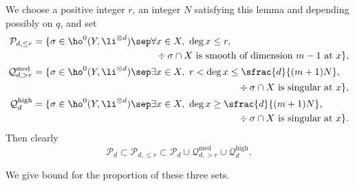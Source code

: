 We choose a positive integer $r$, an integer $N$ satisfying this lemma and depending possibly on $q$, and set
\begin{align*}
\mathcal{P}_{d,\leq r}&=\{ \sigma\in \ho^0(Y,\li^{\otimes d})\sep \forall x\in X,\ \deg x\leq r,\\
&\hspace*{4.5cm} \div \sigma\cap X \text{ is smooth of dimension } m-1 \text{ at }x \}, \\
\mathcal{Q}_{d, >r}^{\mathrm{med}} &= \{ \sigma\in \ho^0(Y,\li^{\otimes d})\sep \exists x\in X,\ r<\deg x\leq \sfrac{d}{(m+1)N},\\ &\hspace*{7.5cm}\div \sigma\cap X \text{ is singular at }x \}, \\
\mathcal{Q}_{d}^{\mathrm{high}}&= \{ \sigma\in \ho^0(Y,\li^{\otimes d})\sep \exists x\in X,\ \deg x\geq \sfrac{d}{(m+1)N},\\
&\hspace*{7.5cm}\div \sigma\cap X \text{ is singular at }x \}.
\end{align*}
Then clearly
\[
\mathcal{P}_{d}\subset\mathcal{P}_{d,\leq r}\subset \mathcal{P}_{d}\cup \mathcal{Q}_{d, >r}^{\mathrm{med}}\cup \mathcal{Q}_{d}^{\mathrm{high}}.
\]

We give bound for the proportion of these three sets.


